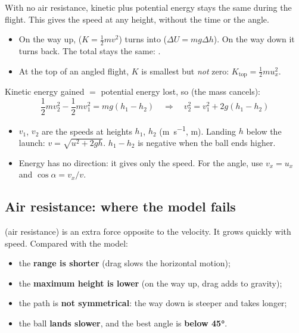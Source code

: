 \begin{bigidea}
With no air resistance, kinetic plus potential energy stays the same during the flight. This
gives the speed at any height, without the time or the angle.
\end{bigidea}

\begin{itemize}
  \item On the way up,  ($K = \frac{1}{2}mv^2$) turns into
         ($\Delta U = mg\Delta h$). On the way down it
        turns back. The total stays the same: .
  \item At the top of an angled flight, $K$ is smallest but \emph{not} zero:
        $K_\mathrm{top} = \frac{1}{2}mu_x^2$.
\end{itemize}

Kinetic energy gained $=$ potential energy lost, so (the mass cancels):
\[ \frac{1}{2}mv_2^2 - \frac{1}{2}mv_1^2 = mg(h_1 - h_2) \quad\Longrightarrow\quad
   v_2^2 = v_1^2 + 2g(h_1 - h_2) \]
{\centering{}\par}
\begin{itemize}
  \item $v_1$, $v_2$ are the speeds at heights $h_1$, $h_2$ (\si{m.s^{-1}}, \si{m}). Landing $h$
        below the launch: $v = \sqrt{u^2 + 2gh}$. $h_1 - h_2$ is negative when the ball ends
        higher.
  \item Energy has no direction: it gives only the speed. For the angle, use $v_x = u_x$ and
        $\cos\alpha = v_x/v$.
\end{itemize}

\subsection{Air resistance: where the model fails}
 (air resistance) is an extra force opposite to the velocity. It grows quickly with
speed. Compared with the model:
\begin{sidebyside}[0.5]
  \begin{itemize}
    \item the \textbf{range is shorter} (drag slows the horizontal motion);
    \item the \textbf{maximum height is lower} (on the way up, drag adds to gravity);
  \end{itemize}
\nextside
  \begin{itemize}
    \item the path is \textbf{not symmetrical}: the way down is steeper and takes longer;
    \item the ball \textbf{lands slower}, and the best angle is \textbf{below \ang{45}}.
  \end{itemize}
\end{sidebyside}

